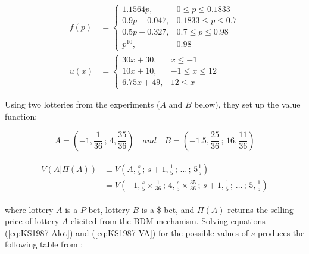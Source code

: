 \documentclass[../main.tex]{subfiles}
\begin{document}
\begin{align}
	f(p) &= 
	\begin{cases} 
		1.1564 p,     & 0 \leq p \leq 0.1833 \\
		0.9p + 0.047, & 0.1833 \leq p \leq 0.7 \\
		0.5p + 0.327, & 0.7 \leq p \leq 0.98 \\
		p^10,         & 0.98
	\end{cases}\label{eq:KS1987-pw}\\
	u(x) &= 
	\begin{cases} 
		30x + 30,     & x \leq -1 \\
		10x + 10,     & -1 \leq x \leq 12 \\
		6.75x + 49,   & 12 \leq x
	\end{cases}\label{eq:KS1987-ux}
\end{align}

Using two lotteries from the \textcite{Grether1979} experiments ($A$ and $B$ below), they set up the value function:

\begin{equation}
	\label{eq:KS1987-Alot}
	A = ( -1, \frac{1}{36} \,;\, 4, \frac{35}{36}) \quad \textit{and} \quad B=(-1.5, \frac{25}{36} \,;\, 16, \frac{11}{36})
\end{equation}

\begin{align}
	\label{eq:KS1987-VA}
	\begin{split}
		V(A|\Pi(A)) &\equiv V \left( A,\frac{s}{5} \,;\, s+1, \frac{1}{5} \,;\, \ldots \,;\, 5 \frac{1}{5} \right)\\
		            &=      V \left(-1,\frac{s}{5} \times \frac{1}{36} \,;\, 4, \frac{s}{5}\times \frac{35}{36} \,;\, s+1, \frac{1}{5} \,;\, \ldots \,;\, 5,\frac{1}{5}  \right)
	\end{split}
\end{align}

\noindent where lottery $A$ is a $P$ bet, lottery $B$ is a \$ bet, and $\Pi(A)$ returns the selling price of lottery $A$ elicited from the BDM mechanism.
Solving equations (\ref{eq:KS1987-Alot}) and (\ref{eq:KS1987-VA}) for the possible values of $s$ produces the following table from \textcite[679]{Karni1987}:
\end{document}
